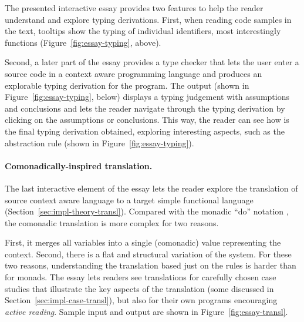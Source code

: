 The presented interactive essay provides two features to help the reader understand and explore
typing derivations. First, when reading code samples in the text, tooltips show the typing of
individual identifiers, most interestingly functions (Figure~\ref{fig:essay-typing}, above).

Second, a later part of the essay provides a type checker that lets the user enter a source code
in a context aware programming language and produces an explorable typing derivation for the
program. The output (shown in Figure~\ref{fig:essay-typing}, below) displays a typing judgement
with assumptions and conclusions and lets the reader navigate through the typing derivation by
clicking on the assumptions or conclusions. This way, the reader can see how is the final typing
derivation obtained, exploring interesting aspects, such as the abstraction rule (shown in
Figure~\ref{fig:essay-typing}).

\paragraph{Comonadically-inspired translation.}

The last interactive element of the essay lets the reader explore the translation of source
context aware language to a target simple functional language (Section~\ref{sec:impl-theory-transl}).
Compared with the monadic ``do'' notation \cite{other-haskell98}, the comonadic translation is more
complex for two reasons.

First, it merges all variables into a single (comonadic) value representing
the context. Second, there is a flat and structural variation of the system. For these two reasons,
understanding the translation based just on the rules is harder than for monads. The essay lets
readers see translations for carefully chosen case studies that illustrate the key aspects of the
translation (some discussed in Section~\ref{sec:impl-case-transl}), but also for their own
programs encouraging \emph{active reading}. Sample input and output are shown in
Figure~\ref{fig:essay-transl}.


